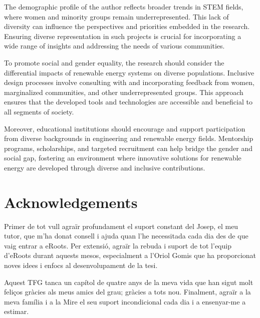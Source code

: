 \documentclass[a4paper,11pt, titlepage, twoside]{article}
\begin{document}
The demographic profile of the author reflects broader trends in STEM fields, where women and minority groups remain underrepresented. This lack of diversity can influence the perspectives and priorities embedded in the research. Ensuring diverse representation in such projects is crucial for incorporating a wide range of insights and addressing the needs of various communities.

To promote social and gender equality, the research should consider the differential impacts of renewable energy systems on diverse populations. Inclusive design processes involve consulting with and incorporating feedback from women, marginalized communities, and other underrepresented groups. This approach ensures that the developed tools and technologies are accessible and beneficial to all segments of society.

Moreover, educational institutions should encourage and support participation from diverse backgrounds in engineering and renewable energy fields. Mentorship programs, scholarships, and targeted recruitment can help bridge the gender and social gap, fostering an environment where innovative solutions for renewable energy are developed through diverse and inclusive contributions.


\section*{Acknowledgements}

Primer de tot vull agraïr profundament el suport constant del Josep, el meu tutor, que m'ha donat consell i ajuda quan
l'he necessitada cada dia des de que vaig entrar a eRoots. Per extensió, agraïr la rebuda i suport de tot l'equip d'eRoots durant aquests mesos,
especialment a l'Oriol Gomis que ha proporcionat noves idees i enfocs al desenvolupament de la tesi.\par

Aquest TFG tanca un capítol de quatre anys de la meva vida que han sigut molt feliços gràcies als meus amics del grau; gràcies a tots nou. 
Finalment, agraïr a la meva família i a la Mire el seu suport incondicional cada dia i a ensenyar-me a estimar.
 
\end{document}

